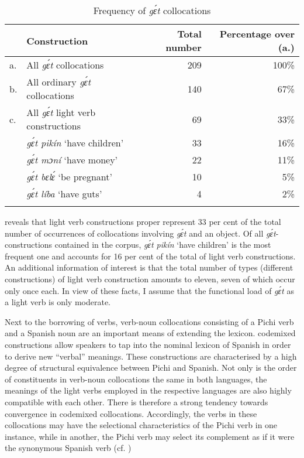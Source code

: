 \begin{table}
\caption{Frequency of \textit{gɛ́t} collocations}
\label{tab:key:9.8}

\begin{tabularx}{\textwidth}{lXrr}
\lsptoprule
& Construction & Total number & Percentage over (a.)\\
\midrule
a. & All \textit{gɛ́t} collocations & 209 & 100\%\\
\tablevspace 
b. & All ordinary \textit{gɛ́t} collocations & 140 & 67\%\\
\tablevspace
c. & All \textit{gɛ́t} light verb constructions & 69 & 33\%\\
   & \textit{gɛ́t pikín}   ‘have children’ & 33 & 16\%\\
   & \textit{gɛ́t mɔní}  ‘have money’ & 22 & 11\%\\
   & \textit{gɛ́t bɛlɛ́}  ‘be pregnant’ & 10 & 5\%\\
   & \textit{gɛ́t líba}   ‘have guts’ & 4 & 2\%\\
\lspbottomrule
\end{tabularx}
\end{table}
 reveals that light verb constructions proper represent 33 per cent of the total number of occurrences of collocations involving \textit{gɛ́t} and an object. Of all \textit{gɛ́t}-constructions contained in the corpus, \textit{gɛ́t pikín} ‘have children’ is the most frequent one and accounts for 16 per cent of the total of light verb constructions. An additional information of interest is that the total number of types (different constructions) of light verb construction amounts to eleven, seven of which occur only once each. In view of these facts, I assume that the functional load of \textit{gɛ́t} as a light verb is only moderate.


Next to the borrowing of  verbs, verb-noun collocations consisting of a Pichi verb and a Spanish noun are an important means of extending the lexicon. codemixed constructions allow speakers to tap into the nominal lexicon of Spanish in order to derive new “verbal” meanings. These constructions are characterised by a high degree of structural equivalence between Pichi and Spanish. Not only is the order of constituents in verb-noun collocations the same in both languages, the meanings of the light verbs employed in the respective languages are also highly compatible with each other. There is therefore a strong tendency towards convergence in codemixed collocations. Accordingly, the verbs in these collocations may have the selectional characteristics of the Pichi verb in one instance, while in another, the Pichi verb may select its complement as if it were the synonymous Spanish verb (cf. \citealt[184]{Muysken2000})



